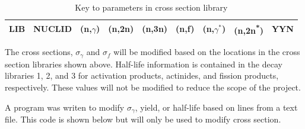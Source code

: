 \documentclass[11pt,notitlepage]{article}
\newcommand{\tss}{\textsuperscript}
\newcommand{\inputdeckpages}[4]{
\begin{itemize}
\item[]
\end{itemize}
}
\begin{document}
\begin{todolist}
  \begin{table}[H]
  \begin{center}
    \caption{Key to parameters in cross section library}
    \label{Table:2}
    \begin{tabular}{l l l l l l l l l}
      \toprule
      LIB & NUCLID & (n,$\gamma$) & (n,2n) & (n,3n) &
      (n,f) & (n,$\gamma^*$) & (n,2n\tss{*}) & YYN\\
      \bottomrule
    \end{tabular}
  \end{center}
  \end{table}

  The cross sections, $\sigma_\gamma$
  and $\sigma_f$ will be modified based on the
  locations in the cross section libraries shown above.
  Half-life information is contained in the decay
  libraries 1, 2, and 3 for activation products, actinides,
  and fission products, respectively. These values will
  not be modified to reduce the scope of the project.

  


  A program was writen to modify $\sigma_\gamma$, yield,
  or half-life based on lines from a text file. This code is
  shown below but will only be used to modify cross section.


\end{todolist}
\end{document}
